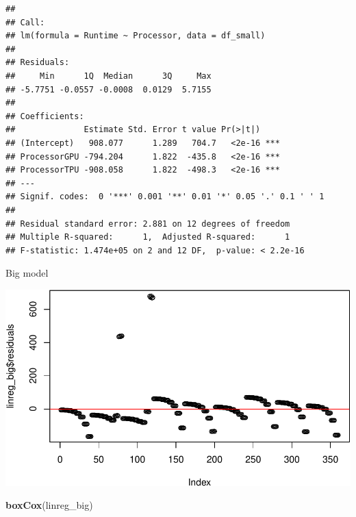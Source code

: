 \documentclass[
]{article}
\newenvironment{Shaded}{\begin{snugshade}}{\end{snugshade}}
\newcommand{\DataTypeTok}[1]{\textcolor[rgb]{0.13,0.29,0.53}{#1}}
\newcommand{\DecValTok}[1]{\textcolor[rgb]{0.00,0.00,0.81}{#1}}
\newcommand{\KeywordTok}[1]{\textcolor[rgb]{0.13,0.29,0.53}{\textbf{#1}}}
\newcommand{\NormalTok}[1]{#1}
\newcommand{\OperatorTok}[1]{\textcolor[rgb]{0.81,0.36,0.00}{\textbf{#1}}}
\newcommand{\StringTok}[1]{\textcolor[rgb]{0.31,0.60,0.02}{#1}}
\begin{document}
\begin{verbatim}
## 
## Call:
## lm(formula = Runtime ~ Processor, data = df_small)
## 
## Residuals:
##     Min      1Q  Median      3Q     Max 
## -5.7751 -0.0557 -0.0008  0.0129  5.7155 
## 
## Coefficients:
##              Estimate Std. Error t value Pr(>|t|)    
## (Intercept)   908.077      1.289   704.7   <2e-16 ***
## ProcessorGPU -794.204      1.822  -435.8   <2e-16 ***
## ProcessorTPU -908.058      1.822  -498.3   <2e-16 ***
## ---
## Signif. codes:  0 '***' 0.001 '**' 0.01 '*' 0.05 '.' 0.1 ' ' 1
## 
## Residual standard error: 2.881 on 12 degrees of freedom
## Multiple R-squared:      1,  Adjusted R-squared:      1 
## F-statistic: 1.474e+05 on 2 and 12 DF,  p-value: < 2.2e-16
\end{verbatim}

Big model

\begin{Shaded}
\end{Shaded}

\includegraphics{main_files/figure-latex/unnamed-chunk-22-1.pdf}

\begin{Shaded}
\begin{Highlighting}[]
\KeywordTok{boxCox}\NormalTok{(linreg\_big)}
\end{Highlighting}
\end{Shaded}
\end{document}
